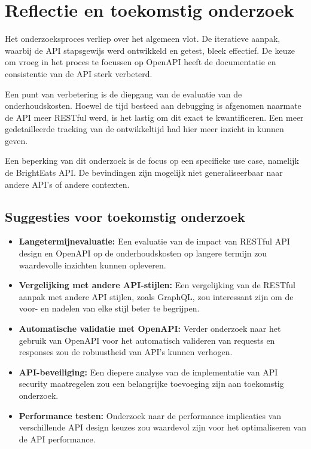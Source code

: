 \section{Reflectie en toekomstig onderzoek}

Het onderzoeksproces verliep over het algemeen vlot. De iteratieve aanpak, waarbij de API stapsgewijs werd ontwikkeld en getest, bleek effectief. De keuze om vroeg in het proces te focussen op OpenAPI heeft de documentatie en consistentie van de API sterk verbeterd.

\bigskip

Een punt van verbetering is de diepgang van de evaluatie van de onderhoudskosten. Hoewel de tijd besteed aan debugging is afgenomen naarmate de API meer RESTful werd, is het lastig om dit exact te kwantificeren. Een meer gedetailleerde tracking van de ontwikkeltijd had hier meer inzicht in kunnen geven.

\bigskip

Een beperking van dit onderzoek is de focus op een specifieke use case, namelijk de BrightEats API. De bevindingen zijn mogelijk niet generaliseerbaar naar andere API's of andere contexten.

\subsection{Suggesties voor toekomstig onderzoek}

\begin{itemize}
  \item \textbf{Langetermijnevaluatie:} Een evaluatie van de impact van RESTful API design en OpenAPI op de onderhoudskosten op langere termijn zou waardevolle inzichten kunnen opleveren.
  \item \textbf{Vergelijking met andere API-stijlen:} Een vergelijking van de RESTful aanpak met andere API stijlen, zoals GraphQL, zou interessant zijn om de voor- en nadelen van elke stijl beter te begrijpen.
  \item \textbf{Automatische validatie met OpenAPI:} Verder onderzoek naar het gebruik van OpenAPI voor het automatisch valideren van requests en responses zou de robuustheid van API's kunnen verhogen.
  \item \textbf{API-beveiliging:} Een diepere analyse van de implementatie van API security maatregelen zou een belangrijke toevoeging zijn aan toekomstig onderzoek.
  \item \textbf{Performance testen:} Onderzoek naar de performance implicaties van verschillende API design keuzes zou waardevol zijn voor het optimaliseren van de API performance.
\end{itemize}

